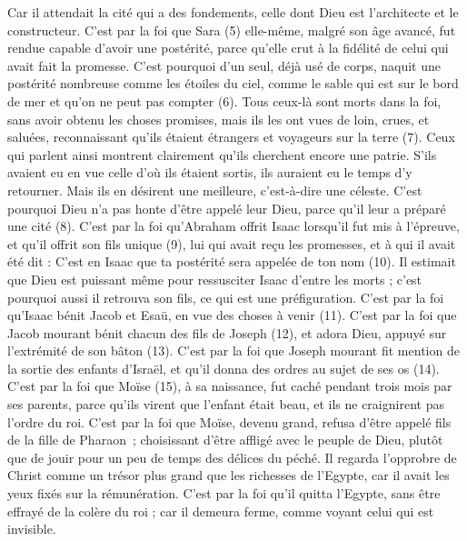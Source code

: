 \begin{multicols}{2}
Car il attendait la cité qui a des fondements, celle dont Dieu est l'architecte et le constructeur.
C’est par la foi que Sara (5) elle-même, malgré son âge avancé, fut rendue capable d’avoir une postérité, parce qu’elle crut à la fidélité de celui qui avait fait la promesse.
C'est pourquoi d'un seul, déjà usé de corps, naquit une postérité nombreuse comme les étoiles du ciel, comme le sable qui est sur le bord de mer et qu’on ne peut pas compter (6).
Tous ceux-là sont morts dans la foi, sans avoir obtenu les choses promises, mais ils les ont vues de loin, crues, et saluées, reconnaissant qu'ils étaient étrangers et voyageurs sur la terre (7).
Ceux qui parlent ainsi montrent clairement qu'ils cherchent encore une patrie.
S’ils avaient eu en vue celle d’où ils étaient sortis, ils auraient eu le temps d’y retourner.
Mais ils en désirent une meilleure, c'est-à-dire une céleste. C’est pourquoi Dieu n’a pas honte d'être appelé leur Dieu, parce qu'il leur a préparé une cité (8).
C’est par la foi qu’Abraham offrit Isaac lorsqu’il fut mis à l’épreuve, et qu’il offrit son fils unique (9), lui qui avait reçu les promesses,
et à qui il avait été dit : C’est en Isaac que ta postérité sera appelée de ton nom (10).
Il estimait que Dieu est puissant même pour ressusciter Isaac d'entre les morts ; c'est pourquoi aussi il retrouva son fils, ce qui est une préfiguration.
\TextTitle{[e. Isaac]}
C’est par la foi qu’Isaac bénit Jacob et Esaü, en vue des choses à venir (11).
\TextTitle{[f. Jacob]}
C’est par la foi que Jacob mourant bénit chacun des fils de Joseph (12), et adora Dieu, appuyé sur l’extrémité de son bâton (13).
\TextTitle{[g. Joseph]}
C’est par la foi que Joseph mourant fit mention de la sortie des enfants d'Israël, et qu’il donna des ordres au sujet de ses os (14).
C’est par la foi que Moïse (15), à sa naissance, fut caché pendant trois mois par ses parents, parce qu’ils virent que l’enfant était beau, et ils ne craignirent pas l’ordre du roi.
\TextTitle{[i. Moïse]}
C’est par la foi que Moïse, devenu grand, refusa d'être appelé fils de la fille de Pharaon ;
choisissant d’être affligé avec le peuple de Dieu, plutôt que de jouir pour un peu de temps des délices du péché.
Il regarda l'opprobre de Christ comme un trésor plus grand que les richesses de l'Egypte, car il avait les yeux fixés sur la rémunération.
C’est par la foi qu’il quitta l'Egypte, sans être effrayé de la colère du roi ; car il demeura ferme, comme voyant celui qui est invisible.

\end{multicols}
